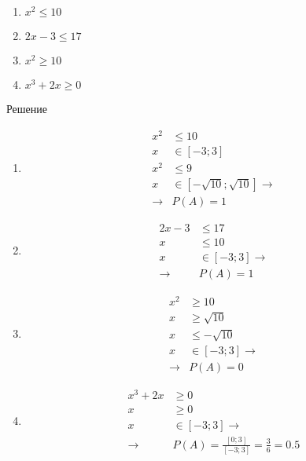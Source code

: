 \documentclass[a4paper,12pt]{article}
\begin{document}
\begin{enumerate}
	\item $x^2\leq10$
	\item $2x-3\leq17$
	\item $x^2\geq10$
	\item $x^3+2x\geq0$
\end{enumerate}

\begin{center}
Решение
\end{center}

\begin{enumerate}
	\item { 
		\begin{align*}
			x^2&\leq10\\
			x&\in[-3;3]\\
			x^2&\leq9\\
			x&\in[-\sqrt{10};\sqrt{10}]\longrightarrow\\
			\longrightarrow& P(A)=1
		\end{align*}
	}
	\item { 
		\begin{align*}
			2x-3&\leq17\\
			x&\leq10\\
			x&\in[-3;3]\longrightarrow\\
			\longrightarrow& P(A)=1
		\end{align*}
	}	
	\item { 
		\begin{align*}			
			x^2&\geq10\\
			x&\geq\sqrt{10}\\
			x&\leq-\sqrt{10}\\
			x&\in[-3;3]\longrightarrow\\
			\longrightarrow& P(A)=0
		\end{align*}
	}	
	\item { 
		\begin{align*}			
			x^3+2x&\geq0\\
			x&\geq0\\
			x&\in[-3;3]\longrightarrow\\			
			\longrightarrow& P(A)=\frac{[0; 3]}{[-3; 3]}=\frac{3}{6}=0.5
		\end{align*}
	}			
\end{enumerate}
\end{document}
